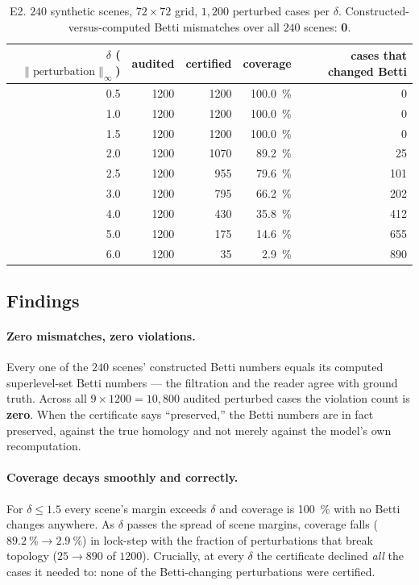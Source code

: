 \documentclass[11pt]{article}
\theoremstyle{definition}
\theoremstyle{plain}
\begin{document}
\begin{table}[t]
\centering
\caption{E2. $240$ synthetic scenes, $72\times72$ grid, $1{,}200$ perturbed
cases per $\delta$. Constructed-versus-computed Betti mismatches over all $240$
scenes: \textbf{0}.}
\label{tab:e2}
\small
\begin{tabular}{@{}rrrrr@{}}
\toprule
$\delta$ ($\lVert\text{perturbation}\rVert_\infty$) & audited & certified &
coverage & cases that changed Betti \\
\midrule
0.5 & 1200 & 1200 & \SI{100.0}{\percent} & 0 \\
1.0 & 1200 & 1200 & \SI{100.0}{\percent} & 0 \\
1.5 & 1200 & 1200 & \SI{100.0}{\percent} & 0 \\
2.0 & 1200 & 1070 & \SI{89.2}{\percent}  & 25 \\
2.5 & 1200 & 955  & \SI{79.6}{\percent}  & 101 \\
3.0 & 1200 & 795  & \SI{66.2}{\percent}  & 202 \\
4.0 & 1200 & 430  & \SI{35.8}{\percent}  & 412 \\
5.0 & 1200 & 175  & \SI{14.6}{\percent}  & 655 \\
6.0 & 1200 & 35   & \SI{2.9}{\percent}   & 890 \\
\bottomrule
\end{tabular}
\end{table}

\subsection{Findings}

\paragraph{Zero mismatches, zero violations.} Every one of the $240$ scenes'
constructed Betti numbers equals its computed superlevel-set Betti numbers ---
the filtration and the reader agree with ground truth. Across all
$9 \times 1200 = 10{,}800$ audited perturbed cases the violation count is
\textbf{zero}. When the certificate says ``preserved,'' the Betti numbers are in
fact preserved, against the true homology and not merely against the model's own
recomputation.

\paragraph{Coverage decays smoothly and correctly.} For $\delta \le 1.5$ every
scene's margin exceeds $\delta$ and coverage is \SI{100}{\percent} with no Betti
changes anywhere. As $\delta$ passes the spread of scene margins, coverage falls
($\SI{89.2}{\percent} \to \SI{2.9}{\percent}$) in lock-step with the fraction of
perturbations that break topology ($25 \to 890$ of $1200$). Crucially, at every
$\delta$ the certificate declined \emph{all} the cases it needed to: none of the
Betti-changing perturbations were certified.
\end{document}
